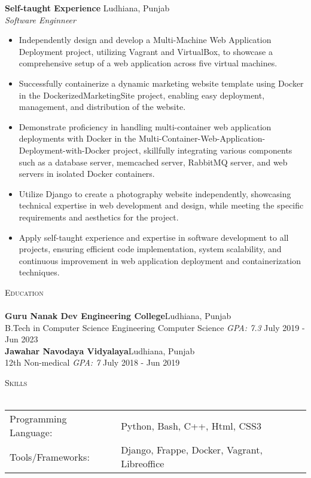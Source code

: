 \documentclass[a4paper]{article}
\newcommand{\lineunder} {
    \vspace*{-8pt} \\
    \hspace*{-18pt} \hrulefill \\
}
\newcommand{\header} [1] {
    {\hspace*{-18pt}\vspace*{6pt} \textsc{#1}}
    \vspace*{-6pt} \lineunder
}
\begin{document}
\textbf{Self-taught Experience} \hfill Ludhiana, Punjab\\
\textit{Software Enginneer}\\
\vspace{-1mm}
\begin{itemize} \itemsep 1pt
	\item Independently design and develop a Multi-Machine Web Application Deployment project, utilizing Vagrant and VirtualBox, to showcase a comprehensive setup of a web application across five virtual machines.
	\item Successfully containerize a dynamic marketing website template using Docker in the DockerizedMarketingSite project, enabling easy deployment, management, and distribution of the website.
	\item Demonstrate proficiency in handling multi-container web application deployments with Docker in the \textquotedbl{}Multi-Container-Web-Application-Deployment-with-Docker\textquotedbl{} project, skillfully integrating various components such as a database server, memcached server, RabbitMQ server, and web servers in isolated Docker containers.
	\item Utilize Django to create a photography website independently, showcasing technical expertise in web development and design, while meeting the specific requirements and aesthetics for the project.
	\item Apply self-taught experience and expertise in software development to all projects, ensuring efficient code implementation, system scalability, and continuous improvement in web application deployment and containerization techniques.
\end{itemize}

\header{Education}
\textbf{Guru Nanak Dev Engineering College}\hfill Ludhiana, Punjab\\
B.Tech in Computer Science Engineering Computer Science \textit{GPA: 7.3} \hfill July 2019 - Jun 2023\\
\vspace{2mm}
\textbf{Jawahar Navodaya Vidyalaya}\hfill Ludhiana, Punjab\\
12th Non-medical \textit{GPA: 7} \hfill July 2018 - Jun 2019\\
\vspace{2mm}

\header{Skills}
\begin{tabular}{ l l }
	Programming Language: & Python, Bash, C++, Html, CSS3                \\
	Tools/Frameworks:     & Django, Frappe, Docker, Vagrant, Libreoffice \\
\end{tabular}
\vspace{2mm}
\end{document}
